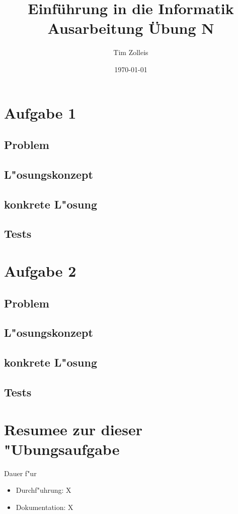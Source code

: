 \documentclass[a4paper,11pt,titlepage]{article}
\begin{document}
    \title{Einf\"uhrung in die Informatik\\
    Ausarbeitung \"Ubung N}


    \author{Tim Zolleis}

    \date{\today}

    \maketitle{\thispagestyle{plain}}


    \section{Aufgabe 1}

    \subsection{Problem}

    \subsection{L"osungskonzept}

    \subsection{konkrete L"osung}

    \subsection{Tests}


    \section{Aufgabe 2}

    \subsection{Problem}

    \subsection{L"osungskonzept}

    \subsection{konkrete L"osung}

    \subsection{Tests}



    \section{Resumee zur dieser "Ubungsaufgabe}
    Dauer f"ur
    \begin{itemize}
        \item Durchf"uhrung: X
        \item Dokumentation: X
    \end{itemize}

    \begin{thebibliography}{99}
    \end{thebibliography}
\end{document}
